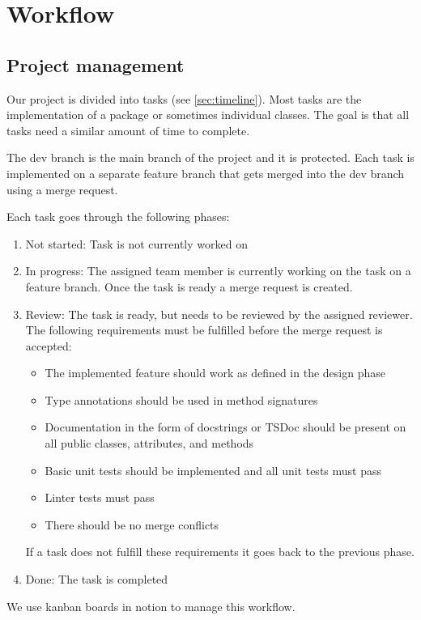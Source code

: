 \section{Workflow}

\subsection*{Project management}
Our project is divided into tasks (see \ref{sec:timeline}).
Most tasks are the implementation of a package or sometimes individual classes. The goal is that all tasks need a similar amount of time to complete.

The dev branch is the main branch of the project and it is protected.
Each task is implemented on a separate feature branch that gets merged into the dev branch using a merge request.

Each task goes through the following phases:
\begin{enumerate}
    \item Not started: Task is not currently worked on
    \item In progress: The assigned team member is currently working on the task on a feature branch. Once the task is ready a merge request is created.
    \item Review: The task is ready, but needs to be reviewed by the assigned reviewer. The following requirements must be fulfilled before the merge request is accepted:
    \begin{itemize}
        \item The implemented feature should work as defined in the design phase
        \item Type annotations should be used in method signatures
        \item Documentation in the form of docstrings or TSDoc should be present on all public classes, attributes, and methods
        \item Basic unit tests should be implemented and all unit tests must pass
        \item Linter tests must pass
        \item There should be no merge conflicts
    \end{itemize}
    If a task does not fulfill these requirements it goes back to the previous phase.
    \item Done: The task is completed
\end{enumerate}
We use kanban boards in \gls{notion} to manage this workflow.

